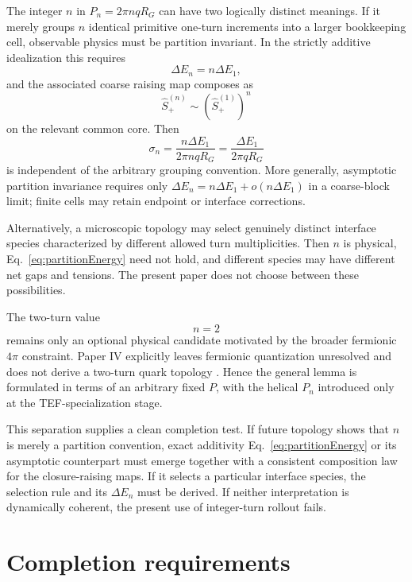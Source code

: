 \documentclass[10pt]{article}
\begin{document}
The integer $n$ in $P_n=2\pi nqR_G$ can have two logically distinct meanings. If it merely groups $n$ identical primitive one-turn increments into a larger bookkeeping cell, observable physics must be partition invariant. In the strictly additive idealization this requires
\begin{equation}
\Delta E_n=n\Delta E_1,
\label{eq:partitionEnergy}
\end{equation}
and the associated coarse raising map composes as
\begin{equation}
\hat S_+^{(n)}\sim(\hat S_+^{(1)})^n
\end{equation}
on the relevant common core. Then
\begin{equation}
\sigma_n=\frac{n\Delta E_1}{2\pi nqR_G}
=\frac{\Delta E_1}{2\pi qR_G}
\end{equation}
is independent of the arbitrary grouping convention. More generally, asymptotic partition invariance requires only $\Delta E_n=n\Delta E_1+o(n\Delta E_1)$ in a coarse-block limit; finite cells may retain endpoint or interface corrections.

Alternatively, a microscopic topology may select genuinely distinct interface species characterized by different allowed turn multiplicities. Then $n$ is physical, Eq.~\eqref{eq:partitionEnergy} need not hold, and different species may have different net gaps and tensions. The present paper does not choose between these possibilities.

The two-turn value
\begin{equation}
n=2
\end{equation}
remains only an optional physical candidate motivated by the broader fermionic $4\pi$ constraint. Paper IV explicitly leaves fermionic quantization unresolved and does not derive a two-turn quark topology \cite{WuMatterSpace}. Hence the general lemma is formulated in terms of an arbitrary fixed $P$, with the helical $P_n$ introduced only at the TEF-specialization stage.

This separation supplies a clean completion test. If future topology shows that $n$ is merely a partition convention, exact additivity Eq.~\eqref{eq:partitionEnergy} or its asymptotic counterpart must emerge together with a consistent composition law for the closure-raising maps. If it selects a particular interface species, the selection rule and its $\Delta E_n$ must be derived. If neither interpretation is dynamically coherent, the present use of integer-turn rollout fails.

\section{Completion requirements}
\label{sec:failure}
\end{document}
